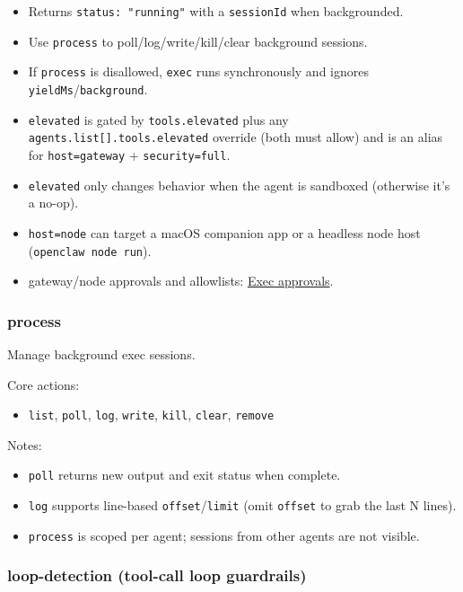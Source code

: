 \begin{itemize}
  \item Returns \texttt{status: "running"} with a \texttt{sessionId} when backgrounded.
  \item Use \texttt{process} to poll/log/write/kill/clear background sessions.
  \item If \texttt{process} is disallowed, \texttt{exec} runs synchronously and ignores \texttt{yieldMs}/\texttt{background}.
  \item \texttt{elevated} is gated by \texttt{tools.elevated} plus any \texttt{agents.list[].tools.elevated} override (both must allow) and is an alias for \texttt{host=gateway} + \texttt{security=full}.
  \item \texttt{elevated} only changes behavior when the agent is sandboxed (otherwise it’s a no-op).
  \item \texttt{host=node} can target a macOS companion app or a headless node host (\texttt{openclaw node run}).
  \item gateway/node approvals and allowlists: \href{/tools/exec-approvals}{Exec approvals}.
\end{itemize}


\subsubsection{process}


Manage background exec sessions.

Core actions:

\begin{itemize}
  \item \texttt{list}, \texttt{poll}, \texttt{log}, \texttt{write}, \texttt{kill}, \texttt{clear}, \texttt{remove}
\end{itemize}


Notes:

\begin{itemize}
  \item \texttt{poll} returns new output and exit status when complete.
  \item \texttt{log} supports line-based \texttt{offset}/\texttt{limit} (omit \texttt{offset} to grab the last N lines).
  \item \texttt{process} is scoped per agent; sessions from other agents are not visible.
\end{itemize}


\subsubsection{loop-detection (tool-call loop guardrails)}


